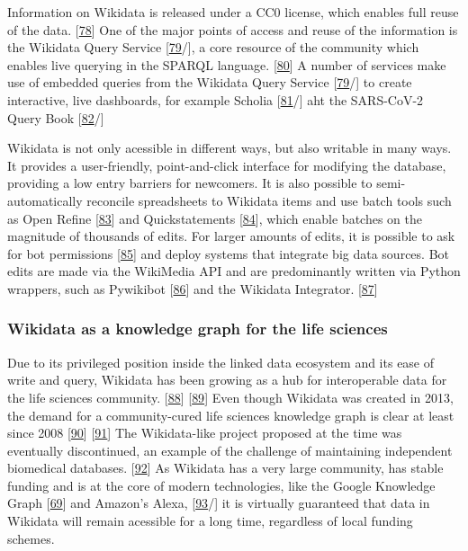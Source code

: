 Information on Wikidata is released under a CC0 license, which enables full reuse of the data. {[}\protect\hyperlink{ref-tQIJPG4k}{78}{]}
One of the major points of access and reuse of the information is the Wikidata Query Service {[}\protect\hyperlink{ref-2wDsXBwd}{79}/{]}, a core resource of the community which enables live querying in the SPARQL language. {[}\protect\hyperlink{ref-t66jYhqe}{80}{]}
A number of services make use of embedded queries from the Wikidata Query Service {[}\protect\hyperlink{ref-2wDsXBwd}{79}/{]} to create interactive, live dashboards, for example Scholia {[}\protect\hyperlink{ref-17P4zruFZ}{81}/{]} aht the SARS-CoV-2 Query Book {[}\protect\hyperlink{ref-guMp3q1V}{82}/{]}

Wikidata is not only acessible in different ways, but also writable in many ways.
It provides a user-friendly, point-and-click interface for modifying the database, providing a low entry barriers for newcomers.
It is also possible to semi-automatically reconcile spreadsheets to Wikidata items and use batch tools such as Open Refine {[}\protect\hyperlink{ref-17rRjL1Xj}{83}{]} and Quickstatements {[}\protect\hyperlink{ref-K6ggpwRg}{84}{]}, which enable batches on the magnitude of thousands of edits.
For larger amounts of edits, it is possible to ask for bot permissions {[}\protect\hyperlink{ref-sSH04fxa}{85}{]} and deploy systems that integrate big data sources.
Bot edits are made via the WikiMedia API and are predominantly written via Python wrappers, such as Pywikibot {[}\protect\hyperlink{ref-5K5MfnVl}{86}{]} and the Wikidata Integrator. {[}\protect\hyperlink{ref-qDI8I4IJ}{87}{]}

\hypertarget{wikidata-as-a-knowledge-graph-for-the-life-sciences}{%
\subsubsection{Wikidata as a knowledge graph for the life sciences}\label{wikidata-as-a-knowledge-graph-for-the-life-sciences}}

Due to its privileged position inside the linked data ecosystem and its ease of write and query, Wikidata has been growing as a hub for interoperable data for the life sciences community. {[}\protect\hyperlink{ref-3GqlN9Dk}{88}{]} {[}\protect\hyperlink{ref-Ym2HoRLl}{89}{]}
Even though Wikidata was created in 2013, the demand for a community-cured life sciences knowledge graph is clear at least since 2008 {[}\protect\hyperlink{ref-179mXrGIk}{90}{]} {[}\protect\hyperlink{ref-TItj7EYf}{91}{]}
The Wikidata-like project proposed at the time was eventually discontinued, an example of the challenge of maintaining independent biomedical databases. {[}\protect\hyperlink{ref-P2QdZvGc}{92}{]}
As Wikidata has a very large community, has stable funding and is at the core of modern technologies, like the Google Knowledge Graph {[}\protect\hyperlink{ref-xLpRePoh}{69}{]} and Amazon's Alexa, {[}\protect\hyperlink{ref-bO7BekzO}{93}/{]} it is virtually guaranteed that data in Wikidata will remain acessible for a long time, regardless of local funding schemes.


